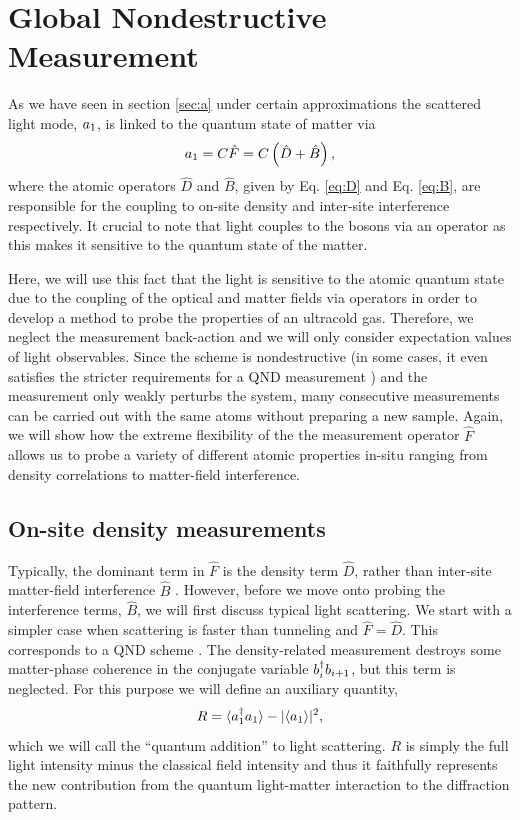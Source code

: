 \section{Global Nondestructive Measurement}

As we have seen in section \ref{sec:a} under certain approximations
the scattered light mode, $a_1$, is linked to the quantum state of
matter via 
\begin{equation}
  \label{eq:a-3}
  a_1 = C \hat{F} = C \left(\hat{D} + \hat{B} \right),
\end{equation}
where the atomic operators $\hat{D}$ and $\hat{B}$, given by
Eq. \eqref{eq:D} and Eq. \eqref{eq:B}, are responsible for the
coupling to on-site density and inter-site interference
respectively. It crucial to note that light couples to the bosons via
an operator as this makes it sensitive to the quantum state of the
matter.

Here, we will use this fact that the light is sensitive to the atomic
quantum state due to the coupling of the optical and matter fields via
operators in order to develop a method to probe the properties of an
ultracold gas. Therefore, we neglect the measurement back-action and
we will only consider expectation values of light observables. Since
the scheme is nondestructive (in some cases, it even satisfies the
stricter requirements for a QND measurement \cite{mekhov2007pra,
  mekhov2012}) and the measurement only weakly perturbs the system,
many consecutive measurements can be carried out with the same atoms
without preparing a new sample. Again, we will show how the extreme
flexibility of the the measurement operator $\hat{F}$ allows us to
probe a variety of different atomic properties in-situ ranging from
density correlations to matter-field interference.

\subsection{On-site density measurements}

Typically, the dominant term in $\hat{F}$ is the density term
$\hat{D}$, rather than inter-site matter-field interference $\hat{B}$
\cite{mekhov2007pra, rist2010, lakomy2009, ruostekoski2009,
  LP2009}. However, before we move onto probing the interference
terms, $\hat{B}$, we will first discuss typical light scattering. We
start with a simpler case when scattering is faster than tunneling and
$\hat{F} = \hat{D}$. This corresponds to a QND scheme
\cite{mekhov2007prl, mekhov2007pra, eckert2008, rogers2014}. The
density-related measurement destroys some matter-phase coherence in
the conjugate variable \cite{mekhov2009pra, LP2010, LP2011}
$b^\dagger_i b_{i+1}$, but this term is neglected. For this purpose we will
define an auxiliary quantity,
\begin{equation}
  \label{eq:R}
  R = \langle a^\dagger_1 a_1 \rangle - | \langle a_1 \rangle |^2,
\end{equation}
which we will call the ``quantum addition'' to light scattering. $R$
is simply the full light intensity minus the classical field intensity
and thus it faithfully represents the new contribution from the
quantum light-matter interaction to the diffraction pattern.

